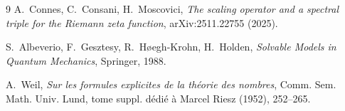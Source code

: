 \documentclass[12pt,a4paper]{article}
\begin{document}
\begin{thebibliography}{9}
A.~Connes, C.~Consani, H.~Moscovici,
\emph{The scaling operator and a spectral triple for the Riemann zeta function},
arXiv:2511.22755 (2025).

S.~Albeverio, F.~Gesztesy, R.~H{\o}egh-Krohn, H.~Holden,
\emph{Solvable Models in Quantum Mechanics}, Springer, 1988.

A.~Weil,
\emph{Sur les formules explicites de la th\'eorie des nombres},
Comm. Sem. Math. Univ. Lund, tome suppl. d\'edi\'e \`a Marcel Riesz (1952), 252--265.
\end{thebibliography}
\end{document}
